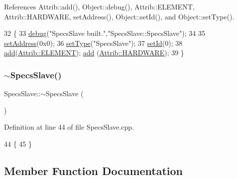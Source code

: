 References Attrib\+::add(), Object\+::debug(), Attrib\+::\+E\+L\+E\+M\+E\+NT, Attrib\+::\+H\+A\+R\+D\+W\+A\+RE, set\+Address(), Object\+::set\+Id(), and Object\+::set\+Type().


\begin{DoxyCode}
32                       \{ 
33   \hyperlink{classObject_aac010553f022165573714b7014a15f0d}{debug}(\textcolor{stringliteral}{"SpecsSlave built."},\textcolor{stringliteral}{"SpecsSlave::SpecsSlave"});
34 
35   \hyperlink{classSpecsSlave_a1e5917c1f323cd7b4aabe4940c6baf12}{setAddress}(0x0);
36   \hyperlink{classObject_aae534cc9d982bcb9b99fd505f2e103a5}{setType}(\textcolor{stringliteral}{"SpecsSlave"});
37   \hyperlink{classObject_a398fe08cba594a0ce6891d59fe4f159f}{setId}(0);
38   \hyperlink{classAttrib_a235f773af19c900264a190b00a3b4ad7}{add}(\hyperlink{classAttrib_a69e171d7cc6417835a5a306d3c764235a7788bc5dd333fd8ce18562b269c9dab1}{Attrib::ELEMENT}); \hyperlink{classAttrib_a235f773af19c900264a190b00a3b4ad7}{add} (\hyperlink{classAttrib_a69e171d7cc6417835a5a306d3c764235a61ceb22149f365f1780d18f9d1459423}{Attrib::HARDWARE});
39 \}
\end{DoxyCode}
\mbox{\label{classSpecsSlave_a8194c1d1a4e7a0e250e5b7dd72b0b437}} 
\subsubsection{\texorpdfstring{$\sim$\+Specs\+Slave()}{~SpecsSlave()}}
{\footnotesize\ttfamily Specs\+Slave\+::$\sim$\+Specs\+Slave (\begin{DoxyParamCaption}{ }\end{DoxyParamCaption})}



Definition at line 44 of file Specs\+Slave.\+cpp.


\begin{DoxyCode}
44                        \{  
45 \}
\end{DoxyCode}


\subsection{Member Function Documentation}
\mbox{\label{classSpecsSlave_af462b4d6e716ceb4bd454ad835938737}} 
